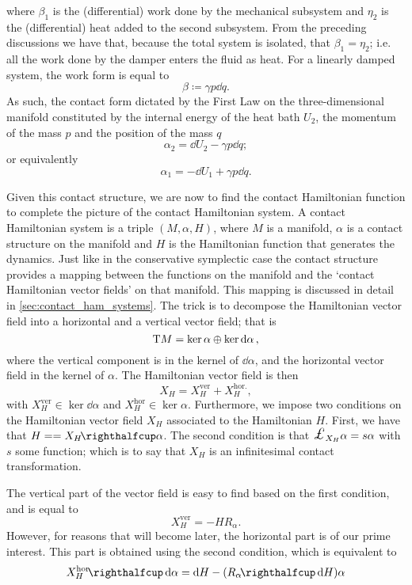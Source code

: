 where $\beta_1$ is the (differential) work done by the mechanical subsystem and $\eta_2$ is the (differential) heat added to the second subsystem. From the preceding discussions we have that, because the total system is isolated, that $ \beta_1 = \eta_2 $; i.e. all the work done by the damper enters the fluid as heat. For a linearly damped system, the work form is equal to 
$$ \beta \coloneq \gamma p \dd{q}. $$
As such, the contact form dictated by the First Law on the three-dimensional manifold constituted by the internal energy of the heat bath $U_2$, the momentum of the mass $p$ and the position of the mass $q$
\begin{equation}
    \alpha_2 = \dd{U}_2 - \gamma p \dd{q};
    \label{eq:dho_contact_form_thermo}
\end{equation}
or equivalently
\begin{equation*}
    \alpha_1 = -\dd{U}_1 + \gamma p \dd{q}.
\end{equation*}

Given this contact structure, we are now to find the contact Hamiltonian function to complete the picture of the contact Hamiltonian system. A contact Hamiltonian system is a triple $(M, \alpha, H)$, where $M$ is a manifold, $\alpha$ is a contact structure on the manifold and $H$ is the Hamiltonian function that generates the dynamics. Just like in the conservative symplectic case the contact structure provides a mapping between the functions on the manifold and the `contact Hamiltonian vector fields' on that manifold. This mapping is discussed in detail in \cref{sec:contact_ham_systems}. The trick is to decompose the Hamiltonian vector field into a horizontal and a vertical vector field; that is
$$ \mathrm{T}M = \ker \alpha \oplus \ker \dd{\alpha},$$
where the vertical component is in the kernel of $ \dd{\alpha}$, and the horizontal vector field in the kernel of $ \alpha $. The Hamiltonian vector field is then 
$$ X_H = X_H^\text{ver} + X_H^\text{hor.}, $$
with $X_H^\text{ver} \in \ker \dd{\alpha}$ and $X_H^\text{hor} \in \ker \alpha$.
Furthermore, we impose two conditions on the Hamiltonian vector field $X_H$ associated to the Hamiltonian $H$. First, we have that $ H = = \intpr{X_H}{\alpha} $. The second condition is that $\lied{X_H}\alpha = s \alpha $ with $s$ some function; which is to say that $X_H$ is an infinitesimal contact transformation. 

The vertical part of the vector field is easy to find based on the first condition, and is equal to
$$ X_H^\text{ver} = -H R_\alpha. $$
However, for reasons that will become later, the horizontal part is of our prime interest. This part is obtained using the second condition, which is equivalent to
\begin{equation}
    \intpr{X_H^\text{hor}}{\dd{\alpha}} = \dd{H} - (\intpr{R_\alpha}{\dd{H}}) \alpha 
    \label{eq:hor_vfield_condition}
\end{equation}

